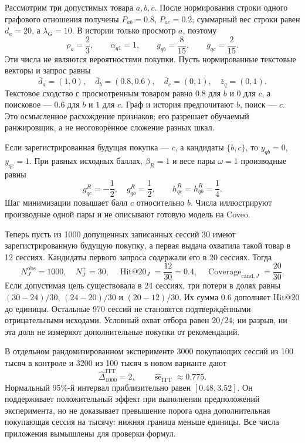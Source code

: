 \documentclass[12pt,a4paper]{article}
\theoremstyle{plainru}
\begin{document}
Рассмотрим три допустимых товара $a,b,c$. После нормирования строки
одного графового отношения получены $P_{ab}=0.8$, $P_{ac}=0.2$;
суммарный вес строки равен $d_a=20$, а $\lambda_G=10$.
В истории только просмотр $a$, поэтому
\begin{equation}\label{eq:app-graph-example}
\rho_a=\frac23,\qquad \alpha_{q1}=1,\qquad
g_{qb}=\frac{8}{15},\qquad g_{qc}=\frac{2}{15}.
\end{equation}
Эти числа не являются вероятностями покупки.
Пусть нормированные текстовые векторы и запрос равны
\begin{equation}\label{eq:app-content-example}
\bar d_a=(1,0),\quad \bar d_b=(0.8,0.6),\quad
\bar d_c=(0,1),\quad\bar z_q=(0,1).
\end{equation}
Текстовое сходство с просмотренным товаром равно $0.8$ для $b$
и $0$ для $c$, а поисковое --- $0.6$ для $b$ и $1$ для $c$.
Граф и история предпочитают $b$, поиск --- $c$.
Это осмысленное расхождение признаков; его разрешает обучаемый
ранжировщик, а не неоговорённое сложение разных шкал.

Если зарегистрированная будущая покупка --- $c$, а кандидаты $\{b,c\}$, то
$y_{qb}=0$, $y_{qc}=1$. При равных исходных баллах,
$\beta_R=1$ и весе пары $\omega=1$ производные равны
\begin{equation}\label{eq:app-gradient-example}
g^R_{qc}=-\frac12,\quad g^R_{qb}=\frac12,
\qquad h^R_{qc}=h^R_{qb}=\frac14.
\end{equation}
Шаг минимизации повышает балл $c$ относительно $b$.
Числа иллюстрируют производные одной пары и не описывают
готовую модель на Coveo.

Теперь пусть из 1000 допущенных записанных сессий 30 имеют
зарегистрированную будущую покупку, а первая выдача охватила такой
товар в 12 сессиях. Кандидаты первого запроса содержали его в 20 сессиях.
Тогда
\begin{equation}\label{eq:app-proxy-example}
N_J^{\mathrm{obs}}=1000,\quad N_J^+=30,\quad
\operatorname{Hit@20}_J=\frac{12}{30}=0.4,\quad
\operatorname{Coverage}_{\mathrm{cand},J}=\frac{20}{30}.
\end{equation}
Если допустимая цель существовала в 24 сессиях, три потери в долях равны
$(30-24)/30$, $(24-20)/30$ и $(20-12)/30$. Их сумма $0.6$
дополняет Hit@20 до единицы. Остальные 970 сессий не становятся
подтверждёнными отрицательными исходами.
Условный охват отбора равен $20/24$; ни разрыв, ни эта доля
не измеряют дополнительные покупки от рекомендаций.

В отдельном рандомизированном эксперименте 3000 покупающих сессий из 100 тысяч в контроле
и 3200 из 100 тысяч в новом варианте дают
\begin{equation}\label{eq:app-business-example}
\widehat\Delta_{1000}^{\mathrm{ITT}}=2,\qquad
\widehat{\operatorname{se}}_{\mathrm{ITT}}\approx0.775.
\end{equation}
Нормальный 95\%-й интервал приблизительно равен $[0.48,3.52]$.
Он поддерживает положительный эффект при выполнении предположений
эксперимента, но не доказывает превышение порога одна дополнительная
покупающая сессия на тысячу: нижняя граница меньше единицы.
Все числа приложения вымышлены для проверки формул.
\end{document}
